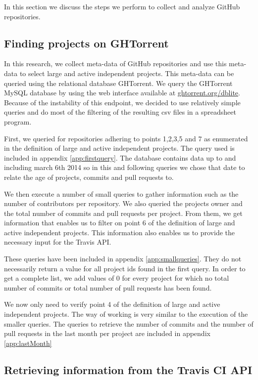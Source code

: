 In this section we discuss the steps we perform to collect and analyze GitHub repositories.

\subsection{Finding projects on GHTorrent}
In this research, we collect meta-data of GitHub repositories and use this meta-data to select large and active independent projects.
This meta-data can be queried using the relational database GHTorrent. \cite{ghtorrent}
We query the GHTorrent MySQL database by using the web interface available at \url{ghtorrent.org/dblite}. 
Because of the instability of this endpoint, we decided to use relatively simple queries and do most of the filtering of the resulting csv files in a spreadsheet program.

First, we queried for repositories adhering to points 1,2,3,5 and 7 as enumerated in the definition of large and active independent projects.
The query used is included in appendix \ref{app:firstquery}.
The database contains data up to and including march 6th 2014 so in this and following queries we chose that date to relate the age of projects, commits and pull requests to.

We then execute a number of small queries to gather information such as the number of contributors per repository. 
We also queried the projects owner and the total number of commits and pull requests per project. 
From them, we get information that enables us to filter on point 6 of the definition of large and active independent projects. 
This information also enables us to provide the necessary input for the Travis API.

These queries have been included in appendix \ref{app:smallqueries}. 
They do not necessarily return a value for all project ids found in the first query.
In order to get a complete list, we add values of 0 for every project for which no total number of commits or total number of pull requests has been found.

We now only need to verify point 4 of the definition of large and active independent projects. 
The way of working is very similar to the execution of the smaller queries. 
The queries to retrieve the number of commits and the number of pull requests in the last month per project are included in appendix \ref{app:lastMonth}

\subsection{Retrieving information from the Travis CI API}

